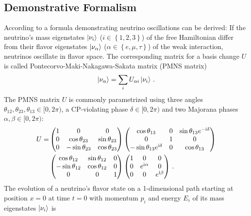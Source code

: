 \subsection{Demonstrative Formalism}
According to \cite{zuber2011neutrino} a formula demonstrating neutrino oscillations can be derived:
If the neutrino's mass eigenstates $\left|\nu_i\right\rangle$ ($i \in \left\{1, 2, 3\right\}$) of the free Hamiltonian differ from their flavor eigenstates $\left|\nu_\alpha\right\rangle$ ($\alpha \in \left\{e,\mu,\tau\right\}$) of the weak interaction, neutrinos oscillate in flavor space. The corresponding matrix for a basis change $U$ is called Pontecorvo-Maki-Nakagawa-Sakata matrix (PMNS matrix)
\begin{equation}
    \left|\nu_\alpha\right\rangle = \sum_{i} U_{\alpha i} \left|\nu_i\right\rangle
    \text{\,.}
\end{equation}
The PMNS matrix $U$ is commonly parametrized using three angles $\theta_{12}, \theta_{23}, \theta_{13} \in [0,2\pi)$, a CP-violating phase $\delta \in [0,2\pi)$ and two Majorana phases $\alpha, \beta \in [0,2\pi)$:
\begin{align}
    \label{eq:PMNSmatrix}
    U =  
    &\begin{pmatrix} 
    1 & 0 & 0 \\ 
    0 & \cos\theta_{23} & \sin\theta_{23} \\ 
    0 & -\sin\theta_{23} & \cos\theta_{23} 
    \end{pmatrix}
    \begin{pmatrix} 
    \cos\theta_{13} & 0 & \sin\theta_{13}e^{-\mathrm{i}\delta} \\ 
    0 & 1 & 0 \\ 
    -\sin\theta_{13}e^{\mathrm{i}\delta} & 0 & \cos\theta_{13} 
    \end{pmatrix} \\ \notag
    &\begin{pmatrix} 
    \cos\theta_{12} & \sin\theta_{12} & 0 \\ 
    -\sin\theta_{12} & \cos\theta_{12} & 0 \\ 
    0 & 0 & 1 
    \end{pmatrix}
    \begin{pmatrix} 
    1 & 0 & 0 \\ 
    0 & e^{\mathrm{i}\alpha} & 0 \\ 
    0 & 0 & e^{\mathrm{i}\beta} 
    \end{pmatrix}
    \text{\,.}
\end{align}
The evolution of a neutrino's flavor state on a 1-dimensional path starting at position $x=0$ at time $t=0$ with momentum $p_i$  and energy $E_i$ of its mass eigenstates $\left|\nu_i\right\rangle$ is
